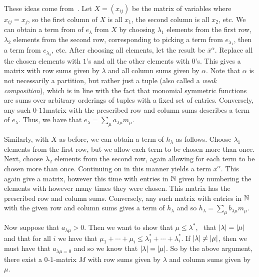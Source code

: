 \documentclass[letterpaper, 11pt, oneside]{book}
\begin{document}
\begin{sol}\label{ex:Manivel_1.1.7}
  These ideas come from~\cite[Proposition 7.4.1]{book:ECII}.
  Let $X = (x_{ij})$ be the matrix of variables where $x_{ij} = x_{j}$, so the first column of $X$ is all $x_{1}$, the second column is all $x_{2}$, etc.
  We can obtain a term from of $e_{\lambda}$ from $X$ by choosing $\lambda_{1}$ elements from the first row, $\lambda_{2}$ elements from the second row, corresponding to picking a term from $e_{\lambda_{1}}$, then a term from $e_{\lambda_{2}}$, etc.
  After choosing all elements, let the result be $\overline{x}^{\alpha}$.
  Replace all the chosen elements with $1$'s and all the other elements with $0$'s.
  This gives a matrix with row sums given by $\lambda$ and all column sums given by $\alpha$.
  Note that $\alpha$ is not necessarily a partition, but rather just a tuple (also called a \emph{weak composition}), which is in line with the fact that monomial symmetric functions are sums over arbitrary orderings of tuples with a fixed set of entries.
  Conversely, any such $0$-$1$1matrix with the prescribed row and column sums describes a term of $e_{\lambda}$.
  Thus, we have that $e_{\lambda} = \sum_{\mu} a_{\lambda \mu} m_{\mu}$.

  Similarly, with $X$ as before, we can obtain a term of $h_{\lambda}$ as follows.
  Choose $\lambda_{1}$ elements from the first row, but we allow each term to be chosen more than once.
  Next, choose $\lambda_{2}$ elements from the second row, again allowing for each term to be chosen more than once.
  Continuing on in this manner yields a term $\overline{x}^{\alpha}$.
  This again give a matrix, however this time with entries in $\mathbb{N}$ given by numbering the elements with however many times they were chosen.
  This matrix has the prescribed row and column sums.
  Conversely, any such matrix with entries in $\mathbb{N}$ with the given row and column sums gives a term of $h_{\lambda}$ and so $h_{\lambda} = \sum_{\mu} b_{\lambda \mu} m_{\mu}$.

  Now suppose that $a_{\lambda \mu} > 0$.
  Then we want to show that $\mu \leq \lambda^{*}$,  \ie\ that $\abs{\lambda} = \abs{\mu}$ and that for all $i$ we have that $\mu_{1} + \cdots + \mu_{i} \leq \lambda^{*}_{1} + \cdots + \lambda^{*}_{i}$.
  If $\abs{\lambda} \neq \abs{\mu}$, then we must have that $a_{\lambda \mu = 0}$ and so we know that $\abs{\lambda} = \abs{\mu}$.
  So by the above argument, there exist a $0$-$1$-matrix $M$ with row sums given by $\lambda$ and column sums given by $\mu$.
\end{sol}
\end{document}
